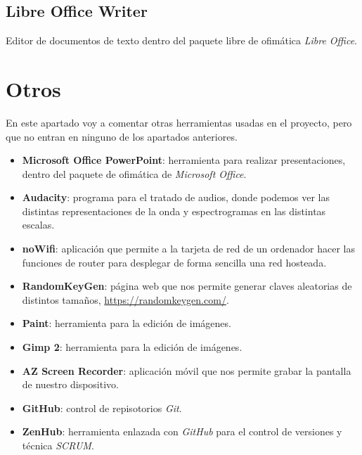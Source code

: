 \subsection{Libre Office Writer}
Editor de documentos de texto dentro del paquete libre de ofimática \textit{Libre Office}.

\section{Otros}
En este apartado voy a comentar otras herramientas usadas en el proyecto, pero que no entran en ninguno de los apartados anteriores.
\begin{itemize}
	\item \textbf{Microsoft Office PowerPoint}: herramienta para realizar presentaciones, dentro del paquete de ofimática de \textit{Microsoft Office}.
	\item \textbf{Audacity}: programa para el tratado de audios, donde podemos ver las distintas representaciones de la onda y espectrogramas en las distintas escalas.
	\item \textbf{noWifi}: aplicación que permite a la tarjeta de red de un ordenador hacer las funciones de router para desplegar de forma sencilla una red hosteada.
	\item \textbf{RandomKeyGen}: página web que nos permite generar claves aleatorias de distintos tamaños, \url{https://randomkeygen.com/}.
	\item \textbf{Paint}: herramienta para la edición de imágenes.
	\item \textbf{Gimp 2}: herramienta para la edición de imágenes.
	\item \textbf{AZ Screen Recorder}: aplicación móvil que nos permite grabar la pantalla de nuestro dispositivo.
	\item \textbf{GitHub}: control de repisotorios \textit{Git}.
	\item \textbf{ZenHub}: herramienta enlazada con \textit{GitHub} para el control de versiones y técnica \textit{SCRUM}.
\end{itemize}